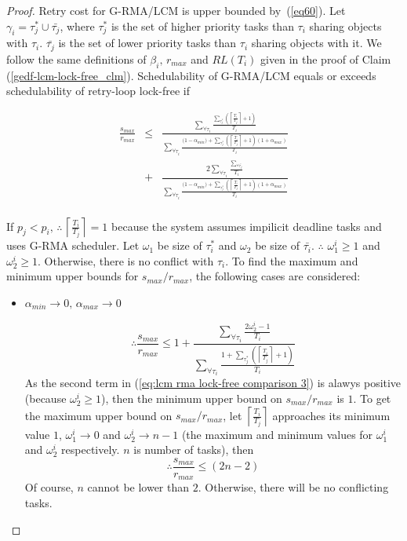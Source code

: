 \documentclass[a4paper,english]{article}
\newtheorem{proof}{Proof}
\begin{document}
\begin{proof}\normalfont

Retry cost for G-RMA/LCM is upper bounded by~(\ref{eq60}). Let $\gamma_{i}=\tau_{j}^{*}\cup\bar{\tau_{j}}$,
where $\tau_{j}^{*}$ is the set of higher priority tasks than $\tau_{i}$
sharing objects with $\tau_{i}$. $\bar{\tau_{j}}$ is the set
of lower priority tasks than $\tau_{i}$ sharing objects with
it. We follow the same definitions of $\beta_{i},\, r_{max}$ and
$RL(T_{i})$ given in the proof of Claim (\ref{gedf-lcm-lock-free_clm}).
Schedulability of G-RMA/LCM equals or exceeds schedulability of retry-loop
lock-free if 

\begin{eqnarray}
\frac{s_{max}}{r_{max}} & \le & \frac{\sum_{\forall\tau_{i}}\frac{\sum_{\tau_{j}^{*}}\left(\left\lceil \frac{T_{i}}{T_{j}}\right\rceil +1\right)}{T_{i}}}{\sum_{\forall\tau_{i}}\frac{\Big(1-\alpha_{min}\Big)+\sum_{\tau_{j}^{*}}\left(\left\lceil \frac{T_{i}}{T_{j}}\right\rceil +1\right)\left(1+\alpha_{max}\right)}{T_{i}}}\nonumber\\
 & + & \frac{2\sum_{\forall\tau_{i}}\frac{\sum_{\forall\bar{\tau_{j}}}}{T_{i}}}{\sum_{\forall\tau_{i}}\frac{\Big(1-\alpha_{min}\Big)+\sum_{\tau_{j}^{*}}\left(\left\lceil \frac{T_{i}}{T_{j}}\right\rceil +1\right)\left(1+\alpha_{max}\right)}{T_{i}}}\nonumber\\
 & & \label{eq:lcm rma lock-free comparison 1} 
\end{eqnarray}


If $p_{j}<p_{i},\,\therefore\,\left\lceil \frac{T_{i}}{T_{j}}\right\rceil =1$
because the system assumes impilicit deadline tasks and uses G-RMA
scheduler. 
%
Let $\omega_{1}$ be size of $\tau_i^*$ and $\omega_{2}$
be size of $\bar{\tau_i}$. $\therefore$ $\omega_{1}^{i}\ge 1$ and $\omega_{2}^{i}\ge1$.
Otherwise, there is no conflict with $\tau_{i}$. To find the maximum
and minimum upper bounds for $s_{max}/r_{max}$, the following cases
are considered:
\begin{itemize}
\item $\alpha_{min}\rightarrow0,\,\alpha_{max}\rightarrow0$


\begin{equation}
\therefore\frac{s_{max}}{r_{max}}\le1+\frac{\sum_{\forall\tau_{i}}\frac{2\omega_{2}^{i}-1}{T_{i}}}{\sum_{\forall\tau_{i}}\frac{1+\sum_{\tau_{j}^{*}}\left(\left\lceil \frac{T_{i}}{T_{j}}\right\rceil +1\right)}{T_{i}}}\label{eq:lcm rma lock-free comparison 3}
\end{equation}
As the second term in (\ref{eq:lcm rma lock-free comparison 3}) is
alawys positive (because $\omega_{2}^{i}\ge1$), then the minimum
upper bound on $s_{max}/r_{max}$ is $1$. To get the maximum upper
bound on $s_{max}/r_{max}$, let $\left\lceil \frac{T_{i}}{T_{j}}\right\rceil $
approaches its minimum value $1$, $\omega_{1}^{i}\rightarrow0$ and $\omega_{2}^{i}\rightarrow n-1$ (the
maximum and minimum values for $\omega_{1}^{i}$ and $\omega_{2}^{i}$
respectively. $n$ is number of tasks), then 
\[
\therefore\frac{s_{max}}{r_{max}}\le\left(2n-2\right)
\]
Of course, $n$ cannot be lower than $2$. Otherwise, there will be
no conflicting tasks.


\end{itemize}
\end{proof}
\end{document}

